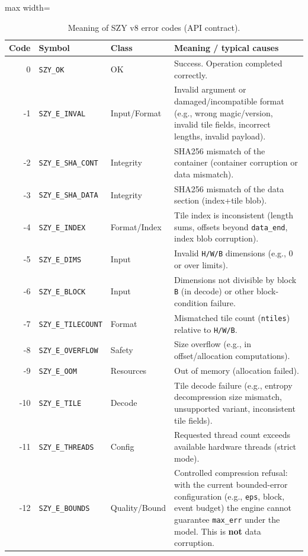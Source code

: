 \documentclass[11pt,a4paper]{article}
\begin{document}
\begin{table}[H]
\centering
\caption{Meaning of SZY v8 error codes (API contract).}
\label{tab:error_codes_meaning}
\begin{adjustbox}{max width=\textwidth}
\begin{tabular}{@{}rllp{8.8cm}@{}}
\toprule
Code & Symbol & Class & Meaning / typical causes \\
\midrule
0   & \texttt{SZY\_OK} & OK &
Success. Operation completed correctly. \\
-1  & \texttt{SZY\_E\_INVAL} & Input/Format &
Invalid argument or damaged/incompatible format (e.g., wrong magic/version, invalid tile fields, incorrect lengths, invalid payload). \\
-2  & \texttt{SZY\_E\_SHA\_CONT} & Integrity &
SHA256 mismatch of the container (container corruption or data mismatch). \\
-3  & \texttt{SZY\_E\_SHA\_DATA} & Integrity &
SHA256 mismatch of the data section (index+tile blob). \\
-4  & \texttt{SZY\_E\_INDEX} & Format/Index &
Tile index is inconsistent (length sums, offsets beyond \texttt{data\_end}, index blob corruption). \\
-5  & \texttt{SZY\_E\_DIMS} & Input &
Invalid \texttt{H/W/B} dimensions (e.g., 0 or over limits). \\
-6  & \texttt{SZY\_E\_BLOCK} & Input &
Dimensions not divisible by block \texttt{B} (in decode) or other block-condition failure. \\
-7  & \texttt{SZY\_E\_TILECOUNT} & Format &
Mismatched tile count (\texttt{ntiles}) relative to \texttt{H/W/B}. \\
-8  & \texttt{SZY\_E\_OVERFLOW} & Safety &
Size overflow (e.g., in offset/allocation computations). \\
-9  & \texttt{SZY\_E\_OOM} & Resources &
Out of memory (allocation failed). \\
-10 & \texttt{SZY\_E\_TILE} & Decode &
Tile decode failure (e.g., entropy decompression size mismatch, unsupported variant, inconsistent tile fields). \\
-11 & \texttt{SZY\_E\_THREADS} & Config &
Requested thread count exceeds available hardware threads (strict mode). \\
-12 & \texttt{SZY\_E\_BOUNDS} & Quality/Bound &
Controlled compression refusal: with the current bounded-error configuration (e.g., \texttt{eps}, block, event budget) the engine cannot guarantee \texttt{max\_err} under the model. This is \textbf{not} data corruption. \\
\bottomrule
\end{tabular}
\end{adjustbox}
\end{table}
\end{document}
